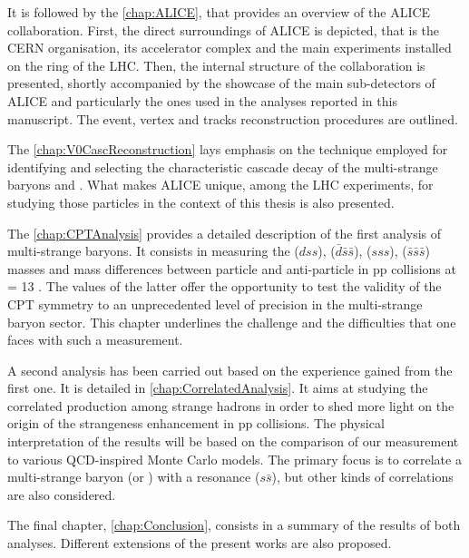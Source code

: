 It is followed by the \chap\ref{chap:ALICE}, that provides an overview of the ALICE collaboration. First, the direct surroundings of ALICE is depicted, that is the CERN organisation, its accelerator complex and the main experiments installed on the ring of the LHC. Then, the internal structure of the collaboration is presented, shortly accompanied by the showcase of the main sub-detectors of ALICE and particularly the ones used in the analyses reported in this manuscript. The event, vertex and tracks reconstruction procedures are outlined.

The \chap\ref{chap:V0CascReconstruction} lays emphasis on the technique employed for identifying and selecting the characteristic cascade decay of the multi-strange baryons \rmXi and \rmOmega. What makes ALICE unique, among the LHC experiments, for studying those particles in the context of this thesis is also presented.

The \chap\ref{chap:CPTAnalysis} provides a detailed description of the first analysis of multi-strange baryons. It consists in measuring the \rmXiM($dss$), \rmAxiP($\bar{d}\bar{s}\bar{s}$), \rmOmegaM($sss$), \rmAomegaP($\bar{s}\bar{s}\bar{s}$)  masses and mass differences between particle and anti-particle in pp collisions at \sqrtS = 13 \tev. The values of the latter offer the opportunity to test the validity of the CPT symmetry to an unprecedented level of precision in the multi-strange baryon sector. This chapter underlines the challenge and the difficulties that one faces with such a measurement.

A second analysis has been carried out based on the experience gained from the first one. It is detailed in \chap\ref{chap:CorrelatedAnalysis}. It aims at studying the correlated production among strange hadrons in order to shed more light on the origin of the strangeness enhancement in pp collisions. The physical interpretation of the results will be based on the comparison of our measurement to various QCD-inspired Monte Carlo models. The primary focus is to correlate a multi-strange baryon (\rmXi or \rmOmega) with a \rmPhiMes resonance ($s\bar{s}$), but other kinds of correlations are also considered.


The final chapter, \chap\ref{chap:Conclusion}, consists in a summary of the results of both analyses. Different extensions of the present works are also proposed.
